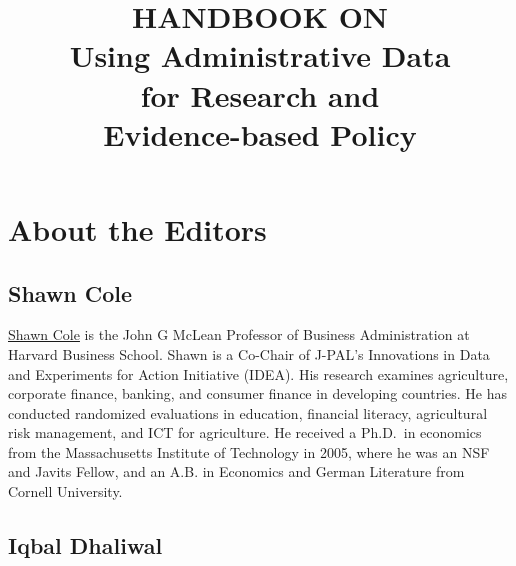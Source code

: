 \documentclass[11pt]{book}
\title{ \Large \uppercase{Handbook on} \\\Huge\bfseries {Using Administrative Data \\ for Research and \\ Evidence-based Policy}}
\author{\sffamily \Large \authorthing}
\date{ }
\makeatletter
\renewcommand{\pagenumbering}[1]{\gdef\thepage{\csname
@#1\endcsname\c@page}}
\makeatother
\begin{document}
\bibliographyunit[\chapter]

\frontmatter
\pagenumbering{roman}

\newpage\null\thispagestyle{empty} 
\newpage

\maketitle

\newpage\null\thispagestyle{empty}
\newpage

\tableofcontents 


\newpage
\pagestyle{fancy}

\cleardoublepage

{}

\section*{About the Editors}\label{about-the-editors}

\subsection*{Shawn Cole}\label{shawn-cole}

\href{https://www.hbs.edu/faculty/Pages/profile.aspx?facId=340064}{Shawn
Cole} is the John G McLean Professor of Business Administration at
Harvard Business School. Shawn is a Co-Chair of J-PAL's Innovations in
Data and Experiments for Action Initiative (IDEA). His research examines
agriculture, corporate finance, banking, and consumer finance in
developing countries. He has conducted randomized evaluations in
education, financial literacy, agricultural risk management, and ICT for
agriculture. He received a Ph.D.~in economics from the Massachusetts
Institute of Technology in 2005, where he was an NSF and Javits Fellow,
and an A.B. in Economics and German Literature from Cornell University.

\subsection*{Iqbal Dhaliwal}\label{iqbal-dhaliwal}
\end{document}
